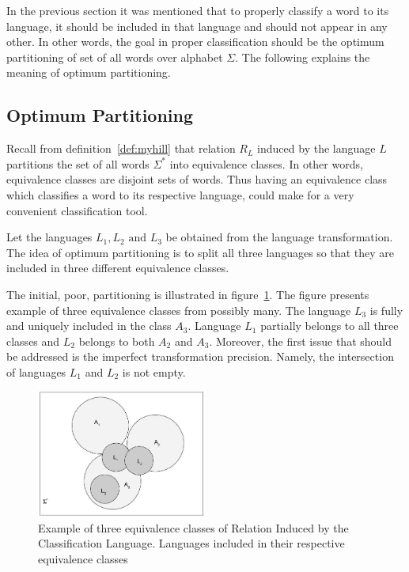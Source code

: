 \documentclass{mini}
\begin{document}
In the previous section it was mentioned that to properly classify a word to its language, it should be included in that language and should not appear in any other. In other words, the goal in proper classification should be the optimum partitioning of set of all words over alphabet $\Sigma$. The following explains the meaning of optimum partitioning.

\subsection{Optimum Partitioning}\label{sec:lan_theory_class_lan_opt_part}

Recall from definition~\ref{def:myhill} that relation $R_L$ induced by the language $L$ partitions the set of all words $\Sigma^{*}$ into equivalence classes. In other words, equivalence classes are disjoint sets of words. Thus having an equivalence class which classifies a word to its respective language, could make for a very convenient classification tool.

Let the languages $L_{1}, L_{2} \text{ and } L_{3}$ be obtained from the language transformation. The idea of optimum partitioning is to split all three languages so that they are included in three different equivalence classes. 

The initial, poor, partitioning is illustrated in figure~\ref{fig:eq_classes_small_precision}. The figure presents example of three equivalence classes from possibly many. The language $L_{3}$ is fully and uniquely included in the class $A_{3}$. Language $L_{1}$ partially belongs to all three classes and $L_{2}$ belongs to both $A_{2}$ and $A_{3}$. Moreover, the first issue that should be addressed is the imperfect transformation precision. Namely, the intersection of languages $L_{1}$ and $L_{2}$ is not empty.

\begin{figure}[H]
    \centering
    \includegraphics[width=0.5\textwidth]{./images/equivalence_classes_small_pt.jpg}
    \caption{Example of three equivalence classes of Relation Induced by the Classification Language. Languages included in their respective equivalence classes}
    \label{fig:eq_classes_small_precision}
\end{figure}
\end{document}
